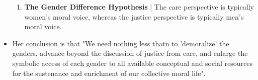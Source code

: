 \documentclass[16pt]{article}
\begin{document}
\begin{itemize}
\begin{enumerate}
            \item \textbf{The Gender Difference Hypothesis} | The care perspective is typically women's moral voice, whereas the justice perspective is typically men's moral voice.
        \end{enumerate}
        \item Her conclusion is that "We need nothing less thatn to 'demoralize' the genders, advance beyond the discussion of justice from care, and enlarge the symbolic access of each gender to all available conceptual and social resources for the sustenance and enrichment of our collective moral life".
    \end{itemize}
\end{document}
